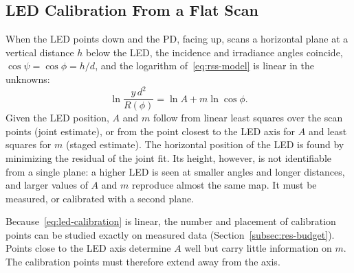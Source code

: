 \subsection{LED Calibration From a Flat Scan}
\label{subsec:led-calibration}
When the LED points down and the PD, facing up, scans a horizontal plane at a vertical distance $h$ below the LED, the incidence and irradiance angles coincide, $\cos\psi=\cos\phi=h/d$, and the logarithm of~\eqref{eq:rss-model} is linear in the unknowns:
\begin{equation}
 \ln\frac{y\,d^2}{R(\phi)}=\ln A+m\ln\cos\phi.
 \label{eq:led-calibration}
\end{equation}
Given the LED position, $A$ and $m$ follow from linear least squares over the scan points (joint estimate), or from the point closest to the LED axis for $A$ and least squares for $m$ (staged estimate). The horizontal position of the LED is found by minimizing the residual of the joint fit. Its height, however, is not identifiable from a single plane: a higher LED is seen at smaller angles and longer distances, and larger values of $A$ and $m$ reproduce almost the same map. It must be measured, or calibrated with a second plane.

Because~\eqref{eq:led-calibration} is linear, the number and placement of calibration points can be studied exactly on measured data (Section~\ref{subsec:res-budget}). Points close to the LED axis determine $A$ well but carry little information on $m$. The calibration points must therefore extend away from the axis.

